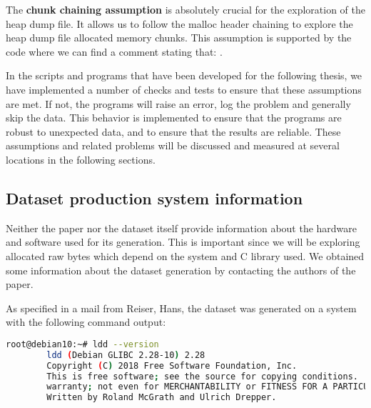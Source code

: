     The \textbf{chunk chaining assumption} is absolutely crucial for the exploration of the heap dump file. It allows us to follow the malloc header chaining to explore the heap dump file allocated memory chunks. This assumption is supported by the code where we can find a comment stating that:  \cite{MallocGLIBC2001}.

    In the scripts and programs that have been developed for the following thesis, we have implemented a number of checks and tests to ensure that these assumptions are met. If not, the programs will raise an error, log the problem and generally skip the data. This behavior is implemented to ensure that the programs are robust to unexpected data, and to ensure that the results are reliable. These assumptions and related problems will be discussed and measured at several locations in the following sections.

    \subsection{Dataset production system information}\label{sec:methods:dataset:production_system_information}
    Neither the paper  nor the dataset itself provide information about the hardware and software used for its generation. This is important since we will be exploring allocated raw bytes which depend on the system and C library used. We obtained some information about the dataset generation by contacting the authors of the paper. 

    As specified in a mail from Reiser, Hans, the dataset was generated on a system with the following command output:

    \begin{minipage}{\dimexpr\linewidth-20pt}
    \begin{lstlisting}[language=bash, caption={Command and logs of the C-library version used for the dataset generation}]
        root@debian10:~# ldd --version
        ldd (Debian GLIBC 2.28-10) 2.28
        Copyright (C) 2018 Free Software Foundation, Inc.
        This is free software; see the source for copying conditions.  There is NO
        warranty; not even for MERCHANTABILITY or FITNESS FOR A PARTICULAR PURPOSE.
        Written by Roland McGrath and Ulrich Drepper.
    \end{lstlisting}
    \end{minipage}

